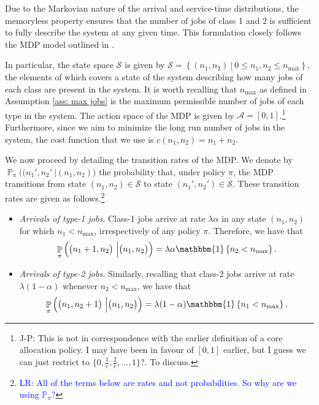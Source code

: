 \documentclass[11pt]{article}
\newcommand{\jp}[1]{\footnote{J-P: #1}}
\theoremstyle{remark}
\theoremstyle{definition}
\DeclareMathOperator{\prob}{\mathbb{P}}
\numberwithin{equation}{section}
\begin{document}
Due to the Markovian nature of the arrival and service-time distributions, the memoryless property ensures that the number of jobs of class 1 and 2 is sufficient to fully describe the system at any given time. 
This formulation closely follows the MDP model outlined in \cite{berg2017}.  {In particular, the state space $\mathcal{S}$ is given by $\mathcal{S} = \left\{(n_1, n_2) \ \big\vert \ 0 \leq n_1, n_2 \leq n_{\max} \right\}$, the elements of which covers a state of the system describing how many jobs of each class are present in the system. It is worth recalling that $n_{\max}$  as defined in Assumption \ref{ass: max jobs} is the maximum permissible number of jobs of each type in the system. The action space of the MDP is given by $\mathcal{A} = [0,1]$.\jp{This is not in correspondence with the earlier definition of a core allocation policy. I may have been in favour of $[0,1]$ earlier, but I guess we can just restrict to $\{0, \frac 1c, \frac 2c, \ldots, 1\}$?. To discuss.} Furthermore, since we aim to minimize the long run number of jobs in the system, the cost function that we use is $c(n_1, n_2) = n_1+n_2$.

We now proceed by detailing the transition rates of the MDP.
We denote by $\prob_{\pi}\big((n_1',n_2' \ \big\vert  (n_1, n_2) \big)$ the probability that, under policy $\pi$, the MDP transitions from state $(n_1, n_2)\in \mathcal{S}$ to state $(n_1', n_2')\in \mathcal{S}$. These transition rates are given as follows.\footnote{\textcolor{blue}{LR: All of the terms below are rates and not probabilities. So why are we using $\mathbb{P}_\pi$?}}

\begin{itemize}
    \item \textit{Arrivals of type-1 jobs.} Class-1 jobs arrive at rate $\lambda\alpha$ in any state $(n_1, n_2)$ for which $n_1<n_{\max}$, irrespectively of any policy $\pi$. Therefore, we have that 
    \begin{equation}
        \prob_{\pi}\Big(\big(n_1 +1,n_2\big) \ \Big\vert \big(n_1, n_2\big) \Big) = \lambda \alpha  \mathbbm{1}\left\{n_2 < n_{\max}\right\}.\label{eqn:transition_prob:1} 
    \end{equation}

    \item \textit{Arrivals of type-2 jobs.} Similarly, recalling that class-2 jobs arrive at rate $\lambda(1-\alpha)$ whenever $n_2<n_{\max}$, we have that 
    \begin{equation}
        \prob_{\pi}\Big(\big(n_1,n_2+1\big) \ \Big\vert \big(n_1, n_2\big) \Big) = \lambda (1-\alpha)\mathbbm{1}\left\{n_1 < n_{\max}\right\}.\label{eqn:transition_prob:1} 
    \end{equation}



\end{itemize}}
\end{document}
